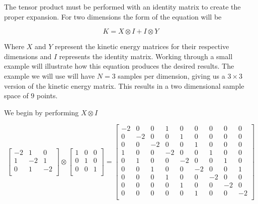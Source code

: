 \documentclass[authoryearcitations]{UoYCSproject}
\begin{document}
The tensor product must be performed with an identity matrix to create the proper expansion. For two dimensions
the form of the equation will be 

\begin{equation}
K = X \otimes I + I \otimes Y
\label{eq:2DTensor}
\end{equation}

Where $X$ and $Y$ represent the kinetic energy matrices for their respective dimensions and $I$ represents the 
identity matrix. Working through a small example will illustrate how this equation produces the desired results. 
The example we will use will have $N = 3$ samples per dimension, giving us a $3 \times 3$ version of the kinetic
energy matrix. This results in a two dimensional sample space of $9$ points. 

We begin by performing $X \otimes I$

\begin{equation}
\begin{bmatrix}
 -2 & 1 & 0 \\
  1 & -2 & 1 \\
  0 & 1 & -2 \\
\end{bmatrix} \otimes \begin{bmatrix}
                        1 & 0 & 0 \\
                        0 & 1 & 0 \\
                        0 & 0 & 1 \\
                      \end{bmatrix} = \begin{bmatrix}
                                        -2 & 0 & 0 & 1 & 0 & 0 & 0 & 0 & 0 \\
                                        0 & -2 & 0 & 0 & 1 & 0 & 0 & 0 & 0 \\ 
                                        0 & 0 & -2 & 0 & 0 & 1 & 0 & 0 & 0 \\
                                        1 & 0 & 0 & -2 & 0 & 0 & 1 & 0 & 0 \\
                                        0 & 1 & 0 & 0 & -2 & 0 & 0 & 1 & 0 \\
                                        0 & 0 & 1 & 0 & 0 & -2 & 0 & 0 & 1 \\
                                        0 & 0 & 0 & 1 & 0 & 0 & -2 & 0 & 0 \\
                                        0 & 0 & 0 & 0 & 1 & 0 & 0 & -2 & 0 \\
                                        0 & 0 & 0 & 0 & 0 & 1 & 0 & 0 & -2 \\
                                      \end{bmatrix}
\label{eq:tensorExample}
\end{equation}
\end{document}
